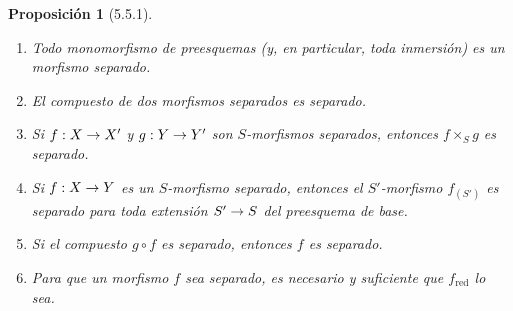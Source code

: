\documentclass[oneside]{amsart}
\theoremstyle{ega-env-style}
\theoremstyle{ega-thm-env-style}
\newtheorem*{proposition}{Proposición}
\theoremstyle{ega-defn-env-style}
\renewcommand{\to}{\mathchoice{\longrightarrow}{\rightarrow}{\rightarrow}{\rightarrow}}
\let\EGAOriginalLabel\label
\renewcommand{\label}[1]{\phantomsection\EGAOriginalLabel{#1}}
\begin{document}
\begin{proposition}[5.5.1]
\label{I.5.5.1}
\medskip\noindent
\begin{enumerate}
  \item[{\rm(i)}] Todo monomorfismo de preesquemas (y, en particular, toda inmersión) es un morfismo separado.
  \item[{\rm(ii)}] El compuesto de dos morfismos separados es separado.
  \item[{\rm(iii)}] Si $f:X\to X'$ y $g:Y\to Y'$ son $S$-morfismos separados, entonces $f\times_S g$ es separado.
  \item[{\rm(iv)}] Si $f:X\to Y$ es un $S$-morfismo separado, entonces el $S'$-morfismo $f_{(S')}$ es separado para toda extensión $S'\to S$ del preesquema de base.
  \item[{\rm(v)}] Si el compuesto $g\circ f$ es separado, entonces $f$ es separado.
  \item[{\rm(vi)}] Para que un morfismo $f$ sea separado, es necesario y suficiente que $f_{\mathrm{red}}$  lo sea.
\end{enumerate}
\end{proposition}
\end{document}
